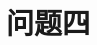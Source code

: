 \documentclass[12pt, a4paper]{article}
\begin{document}
\section{问题四}

\subsection{}



\subsection{}



\subsection{}
\end{document}

